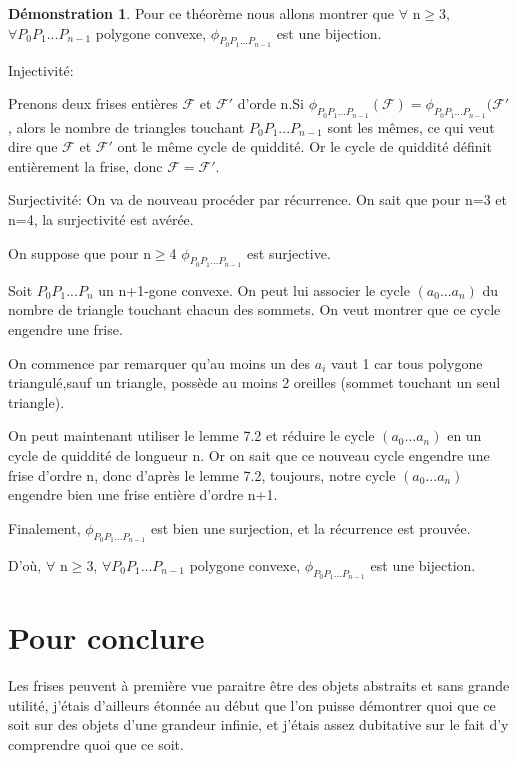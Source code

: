 \documentclass[a4paper]{article}
\theoremstyle{plain}
\theoremstyle{definition}
\theoremstyle{proof}
\newtheorem{dem}{Démonstration}
\theoremstyle{remark}
\begin{document}
\begin{dem}
Pour ce théorème nous allons montrer que $\forall$ n$\ge$3, $\forall P_0P_1...P_{n-1}$ polygone convexe, $\phi_{P_0P_1...P_{n-1}}$ est une bijection.



Injectivité:

Prenons deux frises entières $\mathcal{F}$ et $\mathcal{F'}$ d'orde n.Si $\phi_{P_0P_1...P_{n-1}}(\mathcal{F})=\phi_{P_0P_1...P_{n-1}}(\mathcal{F'}$, alors le nombre de triangles touchant $P_0P_1...P_{n-1}$ sont les mêmes, ce qui veut dire que $\mathcal{F}$ et $\mathcal{F'}$ ont le même cycle de quiddité. Or le cycle de quiddité définit entièrement la frise, donc $\mathcal{F}=\mathcal{F'}$.



Surjectivité:
On va de nouveau procéder par récurrence. On sait que pour n=3 et n=4, la surjectivité est avérée.

On suppose que pour n$\ge$4 $\phi_{P_0P_1...P_{n-1}}$ est surjective.

Soit $P_0P_1...P_n$ un n+1-gone convexe. On peut lui associer le cycle $(a_0 ... a_n)$ du nombre de triangle touchant chacun des sommets. On veut montrer que ce cycle engendre une frise.

On commence par remarquer qu'au moins un des $a_i$ vaut 1 car tous polygone triangulé,sauf un triangle, possède au moins 2 oreilles (sommet touchant un seul triangle).

On peut maintenant utiliser le lemme 7.2 et réduire le cycle $(a_0 ... a_n)$ en un cycle de quiddité de longueur n. Or on sait que ce nouveau cycle engendre une frise d'ordre n, donc d'après le lemme 7.2, toujours, notre cycle $(a_0 ... a_n)$ engendre bien une frise entière d'ordre n+1.

Finalement, $\phi_{P_0P_1...P_{n-1}}$ est bien une surjection, et la récurrence est prouvée.

D'où, $\forall$ n$\ge$3, $\forall P_0P_1...P_{n-1}$ polygone convexe, $\phi_{P_0P_1...P_{n-1}}$ est une bijection.

\end{dem}

\part{Pour conclure}
Les frises peuvent à première vue paraitre être des objets abstraits et sans grande utilité, j'étais d'ailleurs étonnée au début que l'on puisse démontrer quoi que ce soit sur des objets d'une grandeur infinie, et j'étais assez dubitative sur le fait d'y comprendre quoi que ce soit.
\end{document}
